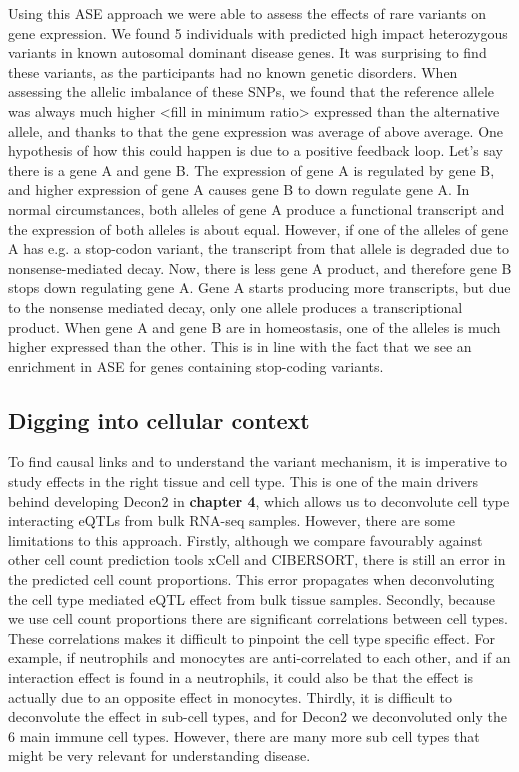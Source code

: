 Using this ASE approach we were able to assess the effects of rare variants on gene expression. We found 5 individuals with predicted high impact heterozygous variants in known autosomal dominant disease genes. It was surprising to find these variants, as the participants had no known genetic disorders. When assessing the allelic imbalance of these SNPs, we found that the reference allele was always much higher <fill in minimum ratio> expressed than the alternative allele, and thanks to that the gene expression was average of above average. One hypothesis of how this could happen is due to a positive feedback loop. Let's say there is a gene A and gene B. The expression of gene A is regulated by gene B, and higher expression of gene A causes gene B to down regulate gene A. In normal circumstances, both alleles of gene A produce a functional transcript and the expression of both alleles is about equal. However, if one of the alleles of gene A has e.g. a stop-codon variant, the transcript from that allele is degraded due to nonsense-mediated decay. Now, there is less gene A product, and therefore gene B stops down regulating gene A. Gene A starts producing more transcripts, but due to the nonsense mediated decay, only one allele produces a transcriptional product. When gene A and gene B are in homeostasis, one of the alleles is much higher expressed than the other. This is in line with the fact that we see an enrichment in ASE for genes containing stop-coding variants.

\subsection{Digging into cellular context}
To find causal links and to understand the variant mechanism, it is imperative to study effects in the right tissue and cell type. This is one of the main drivers behind developing Decon2 in \textbf{chapter 4}, which allows us to deconvolute cell type interacting eQTLs from bulk RNA-seq samples. However, there are some limitations to this approach. Firstly, although we compare favourably against other cell count prediction tools xCell\cite{aranXCellDigitallyPortraying2017} and CIBERSORT\cite{newmanRobustEnumerationCell2015}, there is still an error in the predicted cell count proportions. This error propagates when deconvoluting the cell type mediated eQTL effect from bulk tissue samples. Secondly, because we use cell count proportions there are significant correlations between cell types. These correlations makes it difficult to pinpoint the cell type specific effect. For example, if neutrophils and monocytes are anti-correlated to each other, and if an interaction effect is found in a neutrophils, it could also be that the effect is actually due to an opposite effect in monocytes. Thirdly, it is difficult to deconvolute the effect in sub-cell types, and for Decon2 we deconvoluted only the 6 main immune cell types. However, there are many more sub cell types that might be very relevant for understanding disease.

